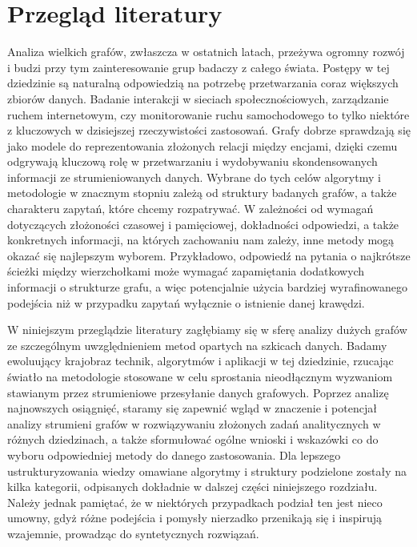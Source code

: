 \chapter{Przegląd literatury}\label{asddassad}

    Analiza wielkich grafów, zwłaszcza w ostatnich latach, przeżywa ogromny rozwój i budzi przy tym zainteresowanie grup badaczy z całego świata. Postępy w tej dziedzinie są naturalną odpowiedzią na potrzebę przetwarzania coraz większych zbiorów danych. Badanie interakcji w sieciach społecznościowych, zarządzanie ruchem internetowym, czy monitorowanie ruchu samochodowego to tylko niektóre z kluczowych w dzisiejszej rzeczywistości zastosowań. Grafy dobrze sprawdzają się jako modele do reprezentowania złożonych relacji między encjami, dzięki czemu odgrywają kluczową rolę w przetwarzaniu i wydobywaniu skondensowanych informacji ze strumieniowanych danych. Wybrane do tych celów algorytmy i metodologie w znacznym stopniu zależą od struktury badanych grafów, a także charakteru zapytań, które chcemy rozpatrywać. W zależności od wymagań dotyczących złożoności czasowej i pamięciowej, dokładności odpowiedzi, a także konkretnych informacji, na których zachowaniu nam zależy, inne metody mogą okazać się najlepszym wyborem. Przykładowo, odpowiedź na pytania o najkrótsze ścieżki między wierzchołkami może wymagać zapamiętania dodatkowych informacji o strukturze grafu, a więc potencjalnie użycia bardziej wyrafinowanego podejścia niż w przypadku zapytań wyłącznie o istnienie danej krawędzi. 

    W niniejszym przeglądzie literatury zagłębiamy się w sferę analizy dużych grafów ze szczególnym uwzględnieniem metod opartych na szkicach danych. Badamy ewoluujący krajobraz technik, algorytmów i aplikacji w tej dziedzinie, rzucając światło na metodologie stosowane w celu sprostania nieodłącznym wyzwaniom stawianym przez strumieniowe przesyłanie danych grafowych. Poprzez analizę najnowszych osiągnięć, staramy się zapewnić wgląd w znaczenie i potencjał analizy strumieni grafów w rozwiązywaniu złożonych zadań analitycznych w różnych dziedzinach, a także sformułować ogólne wnioski i wskazówki co do wyboru odpowiedniej metody do danego zastosowania. Dla lepszego ustrukturyzowania wiedzy omawiane algorytmy i struktury podzielone zostały na kilka kategorii, odpisanych dokładnie w dalszej części niniejszego rozdziału. Należy jednak pamiętać, że w niektórych przypadkach podział ten jest nieco umowny, gdyż różne podejścia i pomysły nierzadko przenikają się i inspirują wzajemnie, prowadząc do syntetycznych rozwiązań. 

